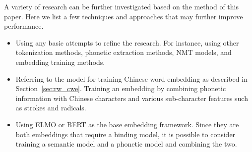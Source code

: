 A variety of research can be further investigated based on the method of this paper.
Here we list a few techniques and approaches that may further improve performance.

\begin{itemize}
    \item Using any basic attempts to refine the research. For instance, using other tokenization methods, phonetic extraction methods, NMT models, and embedding training methods.
    \item Referring to the model for training Chinese word embedding as described in Section~\ref{sec:rw_cwe}. Training an embedding by combining phonetic information with Chinese characters and various sub-character features such as strokes and radicals.
    \item Using ELMO or BERT as the base embedding framework. Since they are both embeddings that require a binding model, it is possible to consider training a semantic model and a phonetic model and combining the two.
\end{itemize}
